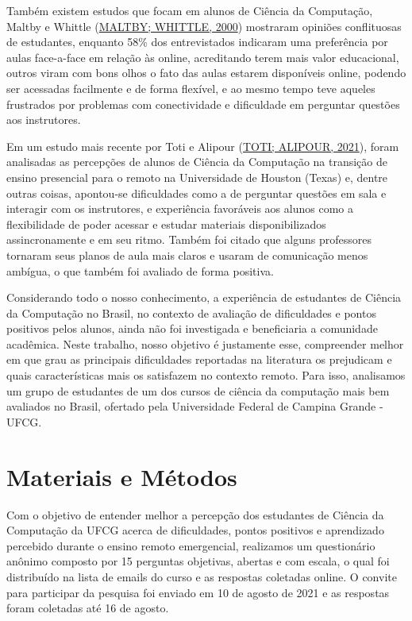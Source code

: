 \documentclass[
  12pt,
  portuguese,
]{article}
\begin{document}
Também existem estudos que focam em alunos de Ciência da Computação,
Maltby e Whittle (\protect\hyperlink{ref-maltby2000learning}{MALTBY;
WHITTLE, 2000}) mostraram opiniões conflituosas de estudantes, enquanto
58\% dos entrevistados indicaram uma preferência por aulas face-a-face
em relação às online, acreditando terem mais valor educacional, outros
viram com bons olhos o fato das aulas estarem disponíveis online,
podendo ser acessadas facilmente e de forma flexível, e ao mesmo tempo
teve aqueles frustrados por problemas com conectividade e dificuldade em
perguntar questões aos instrutores.

Em um estudo mais recente por Toti e Alipour
(\protect\hyperlink{ref-toti2021}{TOTI; ALIPOUR, 2021}), foram
analisadas as percepções de alunos de Ciência da Computação na transição
de ensino presencial para o remoto na Universidade de Houston (Texas) e,
dentre outras coisas, apontou-se dificuldades como a de perguntar
questões em sala e interagir com os instrutores, e experiência
favoráveis aos alunos como a flexibilidade de poder acessar e estudar
materiais disponibilizados assincronamente e em seu ritmo. Também foi
citado que alguns professores tornaram seus planos de aula mais claros e
usaram de comunicação menos ambígua, o que também foi avaliado de forma
positiva.

Considerando todo o nosso conhecimento, a experiência de estudantes de
Ciência da Computação no Brasil, no contexto de avaliação de
dificuldades e pontos positivos pelos alunos, ainda não foi investigada
e beneficiaria a comunidade acadêmica. Neste trabalho, nosso objetivo é
justamente esse, compreender melhor em que grau as principais
dificuldades reportadas na literatura os prejudicam e quais
características mais os satisfazem no contexto remoto. Para isso,
analisamos um grupo de estudantes de um dos cursos de ciência da
computação mais bem avaliados no Brasil, ofertado pela Universidade
Federal de Campina Grande - UFCG.

\hypertarget{materiais-e-muxe9todos}{%
\section{Materiais e Métodos}\label{materiais-e-muxe9todos}}

Com o objetivo de entender melhor a percepção dos estudantes de Ciência
da Computação da UFCG acerca de dificuldades, pontos positivos e
aprendizado percebido durante o ensino remoto emergencial, realizamos um
questionário anônimo composto por 15 perguntas objetivas, abertas e com
escala, o qual foi distribuído na lista de emails do curso e as
respostas coletadas online. O convite para participar da pesquisa foi
enviado em 10 de agosto de 2021 e as respostas foram coletadas até 16 de
agosto.
\end{document}
